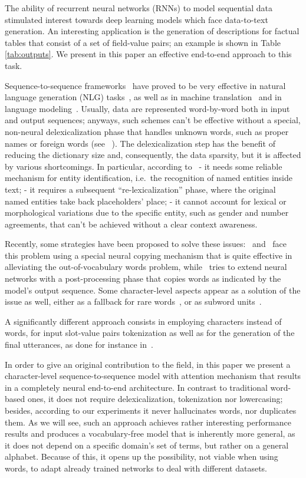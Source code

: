 \documentclass[runningheads, envcountsame, a4paper]{llncs}
\begin{document}
The ability of recurrent neural networks (RNNs) to model sequential data stimulated interest towards deep learning models which face data-to-text generation. An interesting application is the generation of descriptions for factual tables that consist of a set of field-value pairs; an example is shown in Table \ref{tab:outputs}. We present in this paper an effective end-to-end approach to this task.

Sequence-to-sequence frameworks~\cite{Cho:14,Sutskever:14,Aharoni:16} have proved to be very effective in natural language generation (NLG) tasks~\cite{Karpathy:14,Wen:15a,Mei:16}, as well as in machine translation~\cite{Cho:14,Sutskever:14,Bahdanau:14,Sennrich:16} and in language modeling~\cite{Al-Rfou:18}. Usually, data are represented word-by-word both in input and output sequences; anyways, such schemes can't be effective without a special, non-neural delexicalization phase that handles unknown words, such as proper names or foreign words (see ~\cite{Wen:15a}). 
The delexicalization step has the benefit of reducing the dictionary size and, consequently, the data sparsity, but it is affected by various shortcomings. In particular, according to~\cite{Goyal:16} - it needs some reliable mechanism for entity identification, i.e.\ the recognition of named entities inside text; - it requires a subsequent ``re-lexicalization'' phase, where the original named entities take back placeholders' place; - it cannot account for lexical or morphological variations due to the specific entity, such as gender and number agreements, that can't be achieved without a clear context awareness.

Recently, some strategies have been proposed to solve these issues:~\cite{Gu:16} and~\cite{See:17} face this problem using a special neural copying mechanism that is quite effective in alleviating the out-of-vocabulary words problem, while~\cite{Luong:15} tries to extend neural networks with a post-processing phase that copies words as indicated by the model's output sequence. Some character-level aspects appear as a solution of the issue as well, either as a fallback for rare words~\cite{Luong:16}, or as subword units~\cite{Sennrich:16}.

A significantly different approach consists in employing characters instead of words, for input slot-value pairs tokenization as well as for the generation of the final utterances, as done for instance in~\cite{Agarwal:17,Al-Rfou:18}.


In order to give an original contribution to the field, in this paper we present a character-level sequence-to-sequence model with attention mechanism that results in a completely neural end-to-end architecture. In contrast to traditional word-based ones, it does not require delexicalization, tokenization nor lowercasing; besides, according to our experiments it never hallucinates words, nor duplicates them. 
As we will see, such an approach achieves rather interesting performance results and produces a vocabulary-free model that is inherently more general, as it does not depend on a specific domain's set of terms, but rather on a general alphabet. 
Because of this, it opens up the possibility, not viable when using words, to adapt already trained networks to deal with different datasets.
\end{document}
